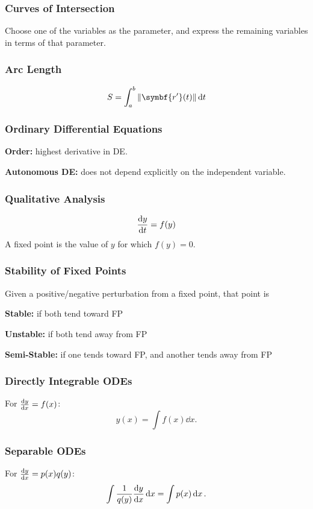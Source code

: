 \documentclass{article}
\begin{document}
\begin{multicols}{3}
    \subsubsection*{Curves of Intersection}
    Choose one of the variables as the parameter, and express the remaining variables in terms of that parameter.
    \subsubsection*{Arc Length}
    \begin{equation*}
        S = \int_a^b \norm{\symbf{r'}(t)} \dd{t}
    \end{equation*}
    \subsubsection*{Ordinary Differential Equations}
    \textbf{Order:} highest derivative in DE.

    \textbf{Autonomous DE:} does not depend explicitly on the independent variable.
    \subsubsection*{Qualitative Analysis}
    \begin{equation*}
        \dv{y}{t} = f(y)
    \end{equation*}
    A fixed point is the value of $y$ for which $f(y) = 0$.
    \subsubsection*{Stability of Fixed Points}
    Given a positive/negative perturbation from a fixed point, that point is

    \textbf{Stable:} if both tend toward FP

    \textbf{Unstable:} if both tend away from FP

    \textbf{Semi-Stable:} if one tends toward FP, and another tends away from FP
    \subsubsection*{Directly Integrable ODEs}
    For $\dv{y}{x} = f(x)$:
    \begin{equation*}
        y(x) = \int f(x) \dd{x}.
    \end{equation*}
    \subsubsection*{Separable ODEs}
    For $\dv{y}{x} = p(x) q(y)$:
    \begin{equation*}
        \int \frac{1}{q(y)} \dv{y}{x} \dd{x} = \int p(x) \dd{x}.
    \end{equation*}

\end{multicols}
\end{document}
